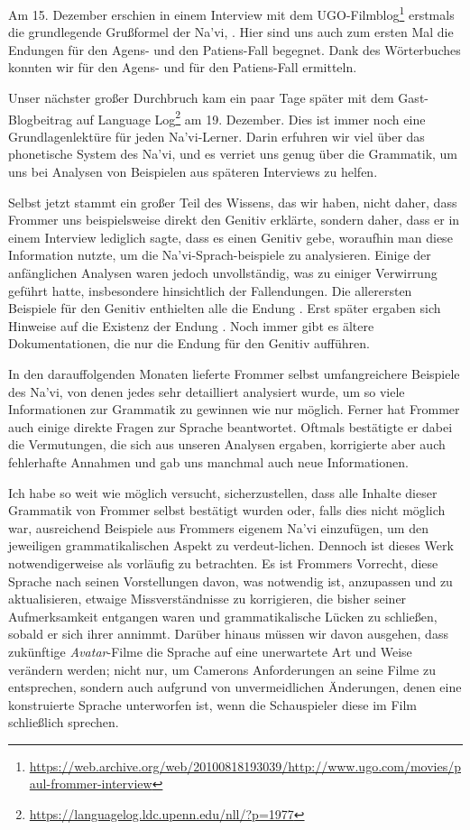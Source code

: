 Am 15. Dezember erschien in einem Interview mit dem UGO-Filmblog\footnote{\url{https://web.archive.org/web/20100818193039/http://www.ugo.com/movies/paul-frommer-interview}} erstmals die grundlegende Grußformel der Na'vi,  . Hier sind uns auch zum ersten Mal die Endungen für den Agens- und den Patiens-Fall begegnet. Dank des Wörterbuches konnten wir  für den Agens- und  für den Patiens-Fall ermitteln.

Unser nächster großer Durchbruch kam ein paar Tage später mit dem Gast-Blogbeitrag auf Language Log\footnote{\url{https://languagelog.ldc.upenn.edu/nll/?p=1977}} am 19. Dezember. Dies ist immer noch eine Grundlagenlektüre für jeden Na'vi-Lerner. Darin erfuhren wir viel über das phonetische System des
Na'vi, und es verriet uns genug über die Grammatik, um uns bei Analysen von Beispielen aus späteren Interviews zu helfen.

Selbst jetzt stammt ein großer Teil des Wissens, das wir haben, nicht daher, dass Frommer uns beispielsweise direkt den Genitiv erklärte, sondern daher, dass er in einem Interview lediglich sagte, dass es einen Genitiv gebe, woraufhin man diese Information nutzte, um die  Na’vi-Sprach-beispiele zu analysieren. Einige der anfänglichen Analysen waren jedoch unvollständig, was zu einiger Verwirrung geführt hatte, insbesondere hinsichtlich der Fallendungen. Die allerersten Beispiele für den Genitiv enthielten alle die Endung . Erst später ergaben sich Hinweise auf die Existenz der
Endung . Noch immer gibt es ältere Dokumentationen, die nur die Endung  für den Genitiv aufführen.

In den darauffolgenden Monaten lieferte Frommer selbst umfangreichere Beispiele des Na'vi, von denen jedes sehr detailliert analysiert wurde, um so viele Informationen zur Grammatik zu gewinnen wie nur möglich. Ferner hat Frommer auch einige direkte Fragen zur Sprache beantwortet. Oftmals bestätigte er dabei die Vermutungen, die sich aus unseren Analysen ergaben, korrigierte aber auch fehlerhafte Annahmen und gab uns manchmal auch neue Informationen.

Ich habe so weit wie möglich versucht, sicherzustellen, dass alle Inhalte dieser Grammatik von Frommer selbst bestätigt wurden oder, falls dies nicht möglich war, ausreichend Beispiele aus Frommers eigenem Na'vi einzufügen, um den jeweiligen grammatikalischen Aspekt zu verdeut-lichen. Dennoch ist dieses Werk notwendigerweise als vorläufig zu betrachten. Es ist Frommers Vorrecht, diese Sprache nach seinen Vorstellungen davon, was notwendig ist, anzupassen und zu aktualisieren, etwaige Missverständnisse zu korrigieren, die bisher seiner Aufmerksamkeit entgangen waren und grammatikalische Lücken zu schließen, sobald er sich ihrer annimmt. Darüber hinaus müssen wir davon ausgehen, dass zukünftige \textit{Avatar}-Filme die Sprache auf eine unerwartete Art und Weise verändern werden; nicht nur, um Camerons Anforderungen an seine Filme zu entsprechen, sondern auch aufgrund von unvermeidlichen Änderungen, denen eine konstruierte Sprache unterworfen ist, wenn die Schauspieler diese im Film schließlich sprechen.


